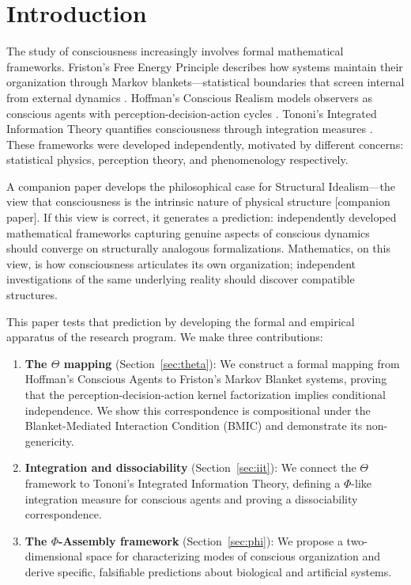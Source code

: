 \documentclass[11pt,a4paper]{article}
\theoremstyle{definition}
\theoremstyle{plain}
\theoremstyle{remark}
\begin{document}
\newpage
\tableofcontents
\newpage

\section{Introduction}\label{sec:intro}

The study of consciousness increasingly involves formal mathematical frameworks. Friston's Free Energy Principle describes how systems maintain their organization through Markov blankets---statistical boundaries that screen internal from external dynamics \citep{Friston2010,Friston2019}. Hoffman's Conscious Realism models observers as conscious agents with perception-decision-action cycles \citep{Hoffman2014,Hoffman2019}. Tononi's Integrated Information Theory quantifies consciousness through integration measures \citep{Tononi2015}. These frameworks were developed independently, motivated by different concerns: statistical physics, perception theory, and phenomenology respectively.

A companion paper develops the philosophical case for Structural Idealism---the view that consciousness is the intrinsic nature of physical structure [companion paper]. If this view is correct, it generates a prediction: independently developed mathematical frameworks capturing genuine aspects of conscious dynamics should converge on structurally analogous formalizations. Mathematics, on this view, is how consciousness articulates its own organization; independent investigations of the same underlying reality should discover compatible structures.

This paper tests that prediction by developing the formal and empirical apparatus of the research program. We make three contributions:

\begin{enumerate}
    \item \textbf{The $\Theta$ mapping} (Section~\ref{sec:theta}): We construct a formal mapping from Hoffman's Conscious Agents to Friston's Markov Blanket systems, proving that the perception-decision-action kernel factorization implies conditional independence. We show this correspondence is compositional under the Blanket-Mediated Interaction Condition (BMIC) and demonstrate its non-genericity.

    \item \textbf{Integration and dissociability} (Section~\ref{sec:iit}): We connect the $\Theta$ framework to Tononi's Integrated Information Theory, defining a $\Phi$-like integration measure for conscious agents and proving a dissociability correspondence.

    \item \textbf{The $\Phi$-Assembly framework} (Section~\ref{sec:phi}): We propose a two-dimensional space for characterizing modes of conscious organization and derive specific, falsifiable predictions about biological and artificial systems.
\end{enumerate}
\end{document}
